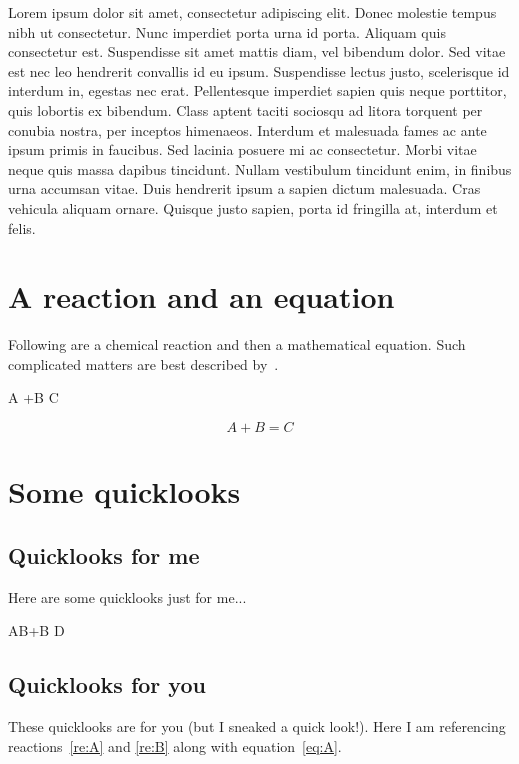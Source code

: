 \documentclass{fsthesis}
\begin{document}
Lorem ipsum dolor sit amet, consectetur adipiscing elit. Donec molestie tempus nibh ut consectetur. Nunc imperdiet porta urna id porta. Aliquam quis consectetur est. Suspendisse sit amet mattis diam, vel bibendum dolor. Sed vitae est nec leo hendrerit convallis id eu ipsum. Suspendisse lectus justo, scelerisque id interdum in, egestas nec erat. Pellentesque imperdiet sapien quis neque porttitor, quis lobortis ex bibendum. Class aptent taciti sociosqu ad litora torquent per conubia nostra, per inceptos himenaeos. Interdum et malesuada fames ac ante ipsum primis in faucibus. Sed lacinia posuere mi ac consectetur. Morbi vitae neque quis massa dapibus tincidunt. Nullam vestibulum tincidunt enim, in finibus urna accumsan vitae. Duis hendrerit ipsum a sapien dictum malesuada. Cras vehicula aliquam ornare. Quisque justo sapien, porta id fringilla at, interdum et felis.





\appendix
\chapter{A reaction and an equation}
Following are a chemical reaction and then a mathematical equation. Such complicated matters are best described by~\citet{article-01}.
\begin{reaction}
\label{re:A}
A +B \rightarrow C
\end{reaction}
\begin{equation}
\label{eq:A}
A +B = C
\end{equation}

\chapter{Some quicklooks}
\section{Quicklooks for me}
Here are some quicklooks just for me...\citep{book-01}
\begin{reaction}
\label{re:B}
AB+B \rightarrow D
\end{reaction}

\section{Quicklooks for you}
These quicklooks are for you (but I sneaked a quick look!). Here I am referencing reactions~\ref{re:A} and \ref{re:B} along with equation~\ref{eq:A}.


\printglossary[type=\acronymtype]



\end{document}
